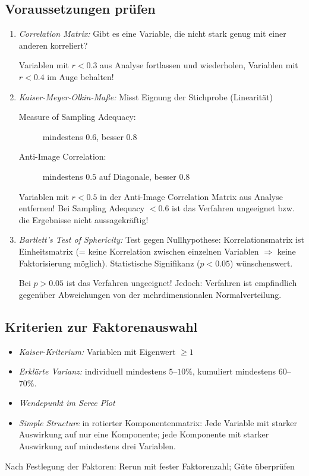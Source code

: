 \subsection{Voraussetzungen prüfen}
\begin{enumerate}
	\item \textit{Correlation Matrix:} Gibt es eine Variable, die nicht stark genug mit einer anderen korreliert?
		\begin{alertbox}
			Variablen mit $r < 0.3$ aus Analyse fortlassen und wiederholen, Variablen mit $r < 0.4$ im Auge behalten!
		\end{alertbox}
	\item \textit{Kaiser-Meyer-Olkin-Maße:} Misst Eignung der Stichprobe (Linearität) 
		\begin{description}
			\item[Measure of Sampling Adequacy:] mindestens $0.6$, besser $0.8$
			\item[Anti-Image Correlation:] mindestens $0.5$ auf Diagonale, besser $0.8$
		\end{description}
		\begin{alertbox}
			Variablen mit $r < 0.5$ in der Anti-Image Correlation Matrix aus Analyse entfernen!
			Bei Sampling Adequacy $< 0.6$ ist das Verfahren ungeeignet bzw. die Ergebnisse nicht aussagekräftig!
		\end{alertbox}
	\item \textit{Bartlett's Test of Sphericity:} Test gegen Nullhypothese: Korrelationsmatrix ist Einheitsmatrix (= keine Korrelation zwischen einzelnen Variablen $\Rightarrow$ keine Faktorisierung möglich).
	Statistische Signifikanz ($p < 0.05$) wünschenswert.  
		\begin{alertbox}
			Bei $p > 0.05$ ist das Verfahren ungeeignet!
			Jedoch: Verfahren ist empfindlich gegenüber Abweichungen von der mehrdimensionalen Normalverteilung.
		\end{alertbox}
\end{enumerate}

\subsection{Kriterien zur Faktorenauswahl}
\begin{itemize}
	\item \textit{Kaiser-Kriterium:} Variablen mit Eigenwert $\geq 1$ 
	\item \textit{Erklärte Varianz:} individuell mindestens $5$--$10\%$, kumuliert mindestens $60$--$70\%$.
	\item \textit{Wendepunkt im Scree Plot} 
	\item \textit{Simple Structure} in rotierter Komponentenmatrix:
		Jede Variable mit starker Auswirkung auf nur eine Komponente; jede Komponente mit starker Auswirkung auf mindestens drei Variablen.
\end{itemize}
Nach Festlegung der Faktoren: Rerun mit fester Faktorenzahl; Güte überprüfen

